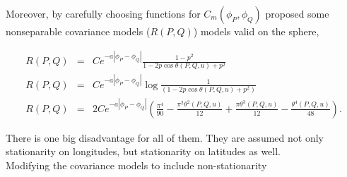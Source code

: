 	
	
	Moreover, by carefully choosing functions for $C_m(\phi_P, \phi_Q)$ \cite{Huang2012} proposed some nonseparable covariance models ($R(P,Q)$) models valid on the sphere,
	
	\begin{eqnarray}
		R(P,Q) &=& Ce^{-a|\phi_P-\phi_Q|} \frac{1-p^2}{1-2p \cos\theta(P,Q,u)+p^2}  \\
		R(P,Q) &=& Ce^{-a|\phi_P-\phi_Q|} \log\frac{1}{(1-2p\cos\theta(P,Q,u) + p^2)} \\
		R(P,Q) &=& 2Ce^{-a|\phi_P-\phi_Q|}\left(\frac{\pi^4}{90}-\frac{\pi^2\theta^2(P,Q,u)}{12}+\frac{\pi\theta^3(P,Q,u)}{12}-\frac{\theta^4(P,Q,u)}{48}\right).
	\end{eqnarray}
	
	There is one big disadvantage for all of them. They are assumed not only stationarity on longitudes, but stationarity on latitudes as well. \\
	
	Modifying the covariance models to include non-stationarity
	
